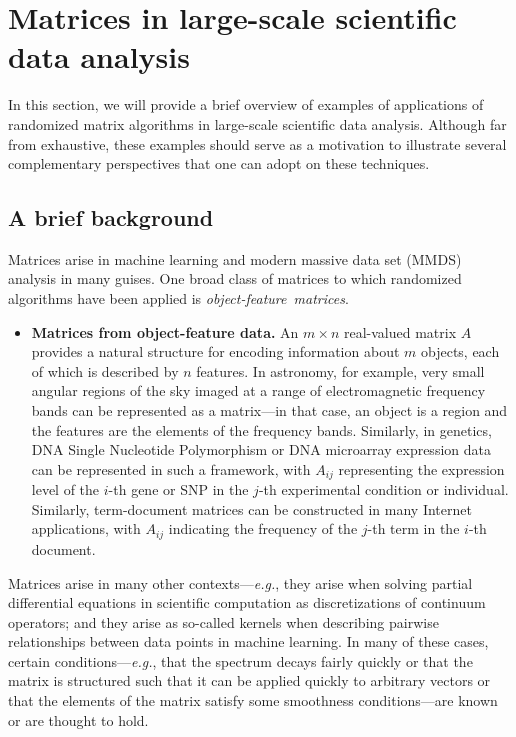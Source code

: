 \documentclass[twoside]{article}
\begin{document}
 \section{Matrices in large-scale scientific data analysis}
\label{sxn:background1}

In this section, we will provide a brief overview of examples of 
applications of randomized matrix algorithms in large-scale scientific data 
analysis.
Although far from exhaustive, these examples should serve as a motivation to 
illustrate several complementary perspectives that one can adopt on these 
techniques.

\subsection{A brief background}
\label{sxn:background1-brief}

Matrices arise in machine learning and modern massive data set (MMDS) 
analysis in many guises.
One broad class of matrices to which randomized algorithms have been applied 
is \emph{object-feature~matrices}. 
\begin{itemize}
\item
\textbf{Matrices from object-feature data.}
An $m \times n$ real-valued matrix $A$ provides a natural structure for 
encoding information about $m$ objects, each of which is described by $n$ 
features.
In astronomy, for example, very small angular regions of the sky imaged at 
a range of electromagnetic frequency bands can be represented as a matrix---in 
that case, an object is a region and the features are the elements of the 
frequency bands.
Similarly, in genetics, DNA Single Nucleotide Polymorphism or DNA 
microarray expression data can be represented in such a framework, with 
$A_{ij}$ representing the expression level of the $i$-th gene or SNP in 
the $j$-th experimental condition or individual. 
Similarly, term-document matrices can be constructed in many Internet 
applications, with $A_{ij}$ indicating the frequency of the $j$-th term in 
the $i$-th document. 
\end{itemize}
Matrices arise in many other contexts---\emph{e.g.}, they arise when solving
partial differential equations in scientific computation as discretizations
of continuum operators; and they arise as so-called kernels when describing 
pairwise relationships between data points in machine learning.
In many of these cases, certain conditions---\emph{e.g.}, that the spectrum
decays fairly quickly or that the matrix is structured such that it can be 
applied quickly to arbitrary vectors or that the elements of the matrix 
satisfy some smoothness conditions---are known or are thought to hold.
\end{document}
